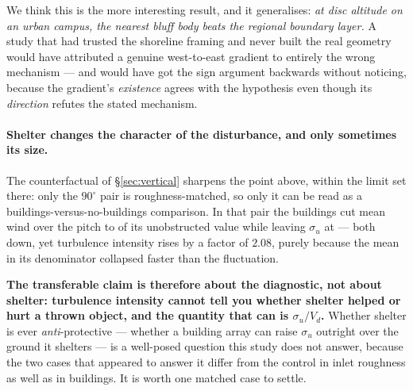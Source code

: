 \documentclass[11pt,letterpaper]{article}
\begin{document}
We think this is the more interesting result, and it generalises: \emph{at disc
altitude on an urban campus, the nearest bluff body beats the regional boundary
layer.} A study that had trusted the shoreline framing and never built the real
geometry would have attributed a genuine west-to-east gradient to entirely the
wrong mechanism --- and would have got the sign argument backwards without
noticing, because the gradient's \emph{existence} agrees with the hypothesis
even though its \emph{direction} refutes the stated mechanism.

\paragraph{Shelter changes the character of the disturbance, and only sometimes its size.}
The counterfactual of \S\ref{sec:vertical} sharpens the point above, within the
limit set there: only the $90^\circ$ pair is roughness-matched, so only it can be read
as a buildings-versus-no-buildings comparison. In that pair the buildings cut mean wind
over the pitch to \VertUratioHNineZero{} of its unobstructed value while leaving
$\sigma_u$ at \VertSigRatioHNineZero{} --- both down, yet turbulence intensity rises by
a factor of $2.08$, purely because the mean in its denominator collapsed faster than
the fluctuation.

\textbf{The transferable claim is therefore about the diagnostic, not about shelter:
turbulence intensity cannot tell you whether shelter helped or hurt a thrown object, and
the quantity that can is $\sigma_u/V_d$.} Whether shelter is ever \emph{anti}-protective
--- whether a building array can raise $\sigma_u$ outright over the ground it shelters
--- is a well-posed question this study does not answer, because the two cases that
appeared to answer it differ from the control in inlet roughness as well as in
buildings. It is worth one matched case to settle.
\end{document}
